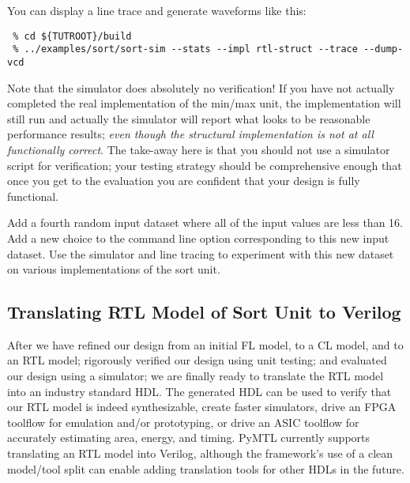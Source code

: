 \documentclass{cbxdoc}
\begin{document}
You can display a line trace and generate waveforms like this:

\begin{verbatim}
 % cd ${TUTROOT}/build
 % ../examples/sort/sort-sim --stats --impl rtl-struct --trace --dump-vcd
\end{verbatim}

Note that the simulator does absolutely no verification! If you have not
actually completed the real implementation of the min/max unit, the
 implementation will still run and actually the simulator
will report what looks to be reasonable performance results; \emph{even
  though the structural implementation is not at all functionally
  correct}. The take-away here is that you should not use a simulator
script for verification; your testing strategy should be comprehensive
enough that once you get to the evaluation you are confident that your
design is fully functional.

\begin{task}
  Add a fourth random input dataset where all of the input values are
  less than 16. Add a new choice to the  command line
  option corresponding to this new input dataset. Use the simulator and
  line tracing to experiment with this new dataset on various
  implementations of the sort unit.
\end{task}

\subsection{Translating RTL Model of Sort Unit to Verilog}

After we have refined our design from an initial FL model, to a CL model,
and to an RTL model; rigorously verified our design using unit testing;
and evaluated our design using a simulator; we are finally ready to
translate the RTL model into an industry standard HDL. The generated HDL
can be used to verify that our RTL model is indeed synthesizable, create
faster simulators, drive an FPGA toolflow for emulation and/or
prototyping, or drive an ASIC toolflow for accurately estimating area,
energy, and timing. PyMTL currently supports translating an RTL model
into Verilog, although the framework's use of a clean model/tool split
can enable adding translation tools for other HDLs in the future.
\end{document}
